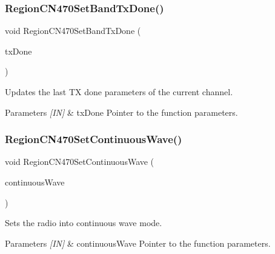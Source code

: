 \subsubsection{\texorpdfstring{Region\+C\+N470\+Set\+Band\+Tx\+Done()}{RegionCN470SetBandTxDone()}}
{\footnotesize\ttfamily void Region\+C\+N470\+Set\+Band\+Tx\+Done (\begin{DoxyParamCaption}\item[{\hyperlink{group__REGION_gad0524aa0673c0814a71e7a4f9cade3fc}{Set\+Band\+Tx\+Done\+Params\+\_\+t} $\ast$}]{tx\+Done }\end{DoxyParamCaption})}



Updates the last TX done parameters of the current channel. 


\begin{DoxyParams}{Parameters}
{\em \mbox{[}\+I\+N\mbox{]}} & tx\+Done Pointer to the function parameters. \\
\hline
\end{DoxyParams}
\mbox{\label{group__REGIONCN470_ga0a1e509012a913631470e9801cc972bd}} 
\subsubsection{\texorpdfstring{Region\+C\+N470\+Set\+Continuous\+Wave()}{RegionCN470SetContinuousWave()}}
{\footnotesize\ttfamily void Region\+C\+N470\+Set\+Continuous\+Wave (\begin{DoxyParamCaption}\item[{\hyperlink{group__REGION_gaf39bb5ba06921139c6d17f88a8d518cd}{Continuous\+Wave\+Params\+\_\+t} $\ast$}]{continuous\+Wave }\end{DoxyParamCaption})}



Sets the radio into continuous wave mode. 


\begin{DoxyParams}{Parameters}
{\em \mbox{[}\+I\+N\mbox{]}} & continuous\+Wave Pointer to the function parameters. \\
\hline
\end{DoxyParams}
\mbox{\label{group__REGIONCN470_ga2de0fae78c1759fec62a835b0fcb3829}} 
